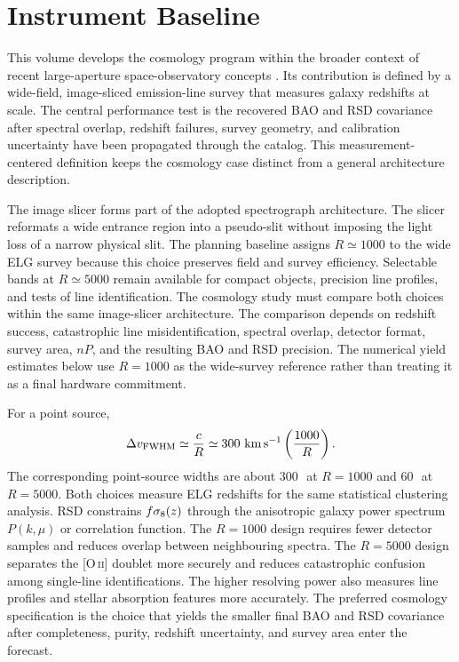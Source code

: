 \section{Instrument Baseline}

This volume develops the cosmology program within the broader context of
recent large-aperture space-observatory concepts \cite{roy2026A,wevers2026A}.
Its contribution is defined by a wide-field, image-sliced emission-line
survey that measures galaxy redshifts at scale. The central performance
test is the recovered BAO and RSD covariance after spectral overlap,
redshift failures, survey geometry, and calibration uncertainty have been
propagated through the catalog. This measurement-centered definition keeps
the cosmology case distinct from a general architecture description.

The image slicer forms part of the adopted spectrograph architecture. The slicer reformats a wide entrance region into a pseudo-slit without imposing the light loss of a narrow physical slit. The planning baseline assigns $R\simeq1000$ to the wide ELG survey because this choice preserves field and survey efficiency. Selectable bands at $R\simeq5000$ remain available for compact objects, precision line profiles, and tests of line identification. The cosmology study must compare both choices within the same image-slicer architecture. The comparison depends on redshift success, catastrophic line misidentification, spectral overlap, detector format, survey area, $nP$, and the resulting BAO and RSD precision. The numerical yield estimates below use $R=1000$ as the wide-survey reference rather than treating it as a final hardware commitment.

For a point source,
\begin{equation}
  \Delta v_{\rm FWHM}\simeq \frac{c}{R}
  \simeq 300\ {\rm km\,s^{-1}}\left(\frac{1000}{R}\right).
\end{equation}
The corresponding point-source widths are about $300$\,\kms\ at $R=1000$ and $60$\,\kms\ at $R=5000$. Both choices measure ELG redshifts for the same statistical clustering analysis. RSD constrains $f\sigma_8(z)$ through the anisotropic galaxy power spectrum $P(k,\mu)$ or correlation function. The $R=1000$ design requires fewer detector samples and reduces overlap between neighbouring spectra. The $R=5000$ design separates the [O\,\textsc{ii}] doublet more securely and reduces catastrophic confusion among single-line identifications. The higher resolving power also measures line profiles and stellar absorption features more accurately. The preferred cosmology specification is the choice that yields the smaller final BAO and RSD covariance after completeness, purity, redshift uncertainty, and survey area enter the forecast.

